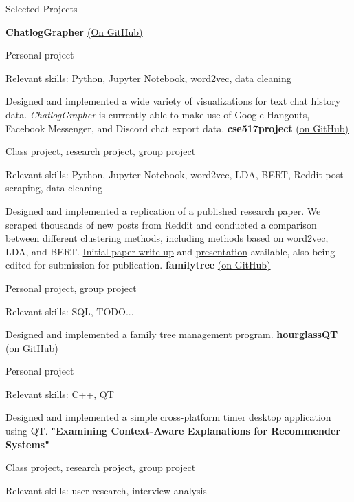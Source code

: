 \begin{rubric}{Selected Projects}

	\textbf{ChatlogGrapher} \href{https://github.com/cephcyn/ChatlogGrapher}{(On GitHub)}
	\par Personal project
	\par Relevant skills: Python, Jupyter Notebook, word2vec, data cleaning
	\par Designed and implemented a wide variety of visualizations for text chat history data. \textit{ChatlogGrapher} is currently able to make use of Google Hangouts, Facebook Messenger, and Discord chat export data.
	\textbf{cse517project} \href{https://github.com/cephcyn/cse517project}{(on GitHub)}
	\par Class project, research project, group project
	\par Relevant skills: Python, Jupyter Notebook, word2vec, LDA, BERT, Reddit post scraping, data cleaning
	\par Designed and implemented a replication of a published research paper. We scraped thousands of new posts from Reddit and conducted a comparison between different clustering methods, including methods based on word2vec, LDA, and BERT. \href{https://github.com/cephcyn/cephcyn.github.io/raw/master/documents/u_cse517/final_writeup.pdf}{Initial paper write-up} and \href{https://www.youtube.com/watch?v=SgzpiQQEeEU}{presentation} available, also being edited for submission for publication.
	\textbf{familytree} \href{https://github.com/cephcyn/familytree}{(on GitHub)}
	\par Personal project, group project
	\par Relevant skills: SQL, TODO...
	\par Designed and implemented a family tree management program.
	\textbf{hourglassQT} \href{https://github.com/cephcyn/hourglassQT}{(on GitHub)}
	\par Personal project
	\par Relevant skills: C++, QT
	\par Designed and implemented a simple cross-platform timer desktop application using QT.
\entry*[2020] %
	\textbf{"Examining Context-Aware Explanations for Recommender Systems"} %
	\par Class project, research project, group project
	\par Relevant skills: user research, interview analysis

\end{rubric}
